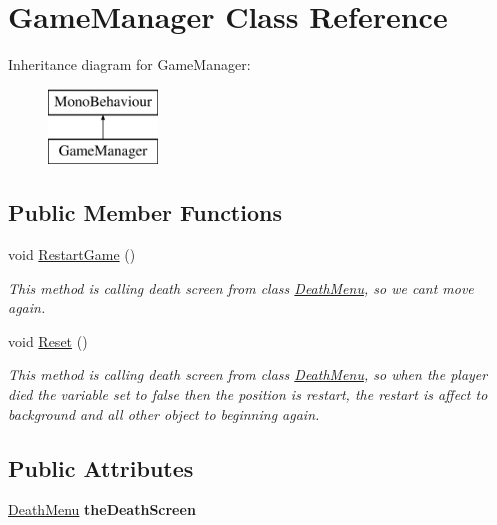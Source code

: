 \hypertarget{class_game_manager}{}\section{Game\+Manager Class Reference}
\label{class_game_manager}
Inheritance diagram for Game\+Manager\+:\begin{figure}[H]
\begin{center}
\leavevmode
\includegraphics[height=2.000000cm]{class_game_manager}
\end{center}
\end{figure}
\subsection*{Public Member Functions}
\begin{DoxyCompactItemize}
\item 
void \hyperlink{class_game_manager_acad1293048a68e6ba14c1a62c7503c09}{Restart\+Game} ()
\begin{DoxyCompactList}\small\item\em This method is calling death screen from class \hyperlink{class_death_menu}{Death\+Menu}, so we can\textquotesingle{}t move again. \end{DoxyCompactList}\item 
void \hyperlink{class_game_manager_a50401d6452934e7e126cd24bd5e04e79}{Reset} ()
\begin{DoxyCompactList}\small\item\em This method is calling death screen from class \hyperlink{class_death_menu}{Death\+Menu}, so when the player died the variable set to false then the position is restart, the restart is affect to background and all other object to beginning again. \end{DoxyCompactList}\end{DoxyCompactItemize}
\subsection*{Public Attributes}
\begin{DoxyCompactItemize}
\item 
\hypertarget{class_game_manager_a50d690b85cfce532a760b7b9d811adaf}{}\label{class_game_manager_a50d690b85cfce532a760b7b9d811adaf} 
\hyperlink{class_death_menu}{Death\+Menu} {\bfseries the\+Death\+Screen}
\end{DoxyCompactItemize}
